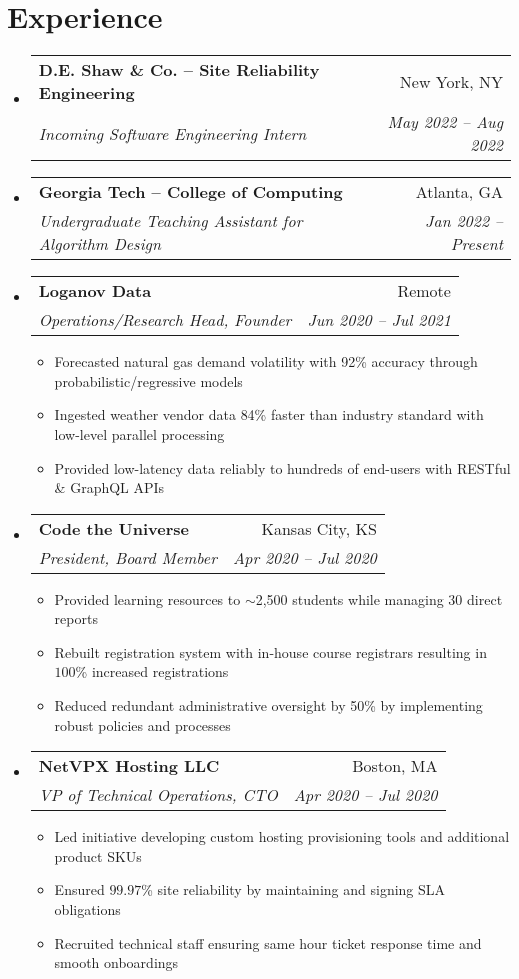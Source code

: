 \documentclass[a4paper,11pt]{extarticle}
\makeatletter
\newcommand{\resumeItem}[1]{
	\item\small{
		#1 \vspace{-2pt}
	}
}
\newcommand{\resumeSubheading}[4]{
	\vspace{-1pt}\item
		\begin{tabular*}{1\linewidth}{l@{\extracolsep{\fill}}r}
			\textbf{#1} & #2 \\
			\textit{#3} & \textit{#4} \\
		\end{tabular*}\vspace{-3pt}
}
\newcommand{\resumeSubHeadingListStart}{\begin{itemize}[leftmargin=0.15in,label={}]}
\newcommand{\resumeSubHeadingListEnd}{\end{itemize}}
\newcommand{\resumeItemListStart}{\begin{itemize}\vspace{-3pt}}
\newcommand{\resumeItemListEnd}{\end{itemize}\vspace{-3pt}}
\makeatother
\begin{document}
\section{Experience}
	\resumeSubHeadingListStart
        \resumeSubheading
            {D.E. Shaw \& Co. -- Site Reliability Engineering}
            {New York, NY}
            {Incoming Software Engineering Intern}
            {May 2022 -- Aug 2022}
        \vspace{-1mm}
        \resumeSubheading
            {Georgia Tech -- College of Computing}
            {Atlanta, GA}
            {Undergraduate Teaching Assistant for Algorithm Design}
            {Jan 2022 -- Present}
        \vspace{-1mm}
		\resumeSubheading
            {Loganov Data}
            {Remote}
		    {Operations/Research Head, Founder}
            {Jun 2020 -- Jul 2021}
		\resumeItemListStart
			\resumeItem{Forecasted natural gas demand volatility with 92\%
				accuracy through probabilistic/regressive models}
			\resumeItem{Ingested weather vendor data 84\% faster than industry
				standard with low-level parallel processing}
			\resumeItem{Provided low-latency data reliably to hundreds of
				end-users with RESTful \& GraphQL APIs}
		\resumeItemListEnd
		\resumeSubheading
            {Code the Universe}
            {Kansas City, KS}
		    {President, Board Member}
            {Apr 2020 -- Jul 2020}
		\resumeItemListStart
			\resumeItem{Provided learning resources to $\sim$2,500
				students while managing 30 direct reports}
			\resumeItem{Rebuilt registration system with in-house course
				registrars resulting in $100$\% increased registrations}
			\resumeItem{Reduced redundant administrative oversight by 50\% by
				implementing robust policies and processes}
		\resumeItemListEnd
		\resumeSubheading
            {NetVPX Hosting LLC}
            {Boston, MA}
		    {VP of Technical Operations, CTO}
            {Apr 2020 -- Jul 2020}
		\resumeItemListStart
			\resumeItem{Led initiative developing custom hosting provisioning
				tools and additional product SKUs}
			\resumeItem{Ensured $99.97$\% site reliability by maintaining
				and signing SLA obligations}
			\resumeItem{Recruited technical staff ensuring same hour ticket
				response time and smooth onboardings}
		\resumeItemListEnd
	\resumeSubHeadingListEnd
\end{document}
